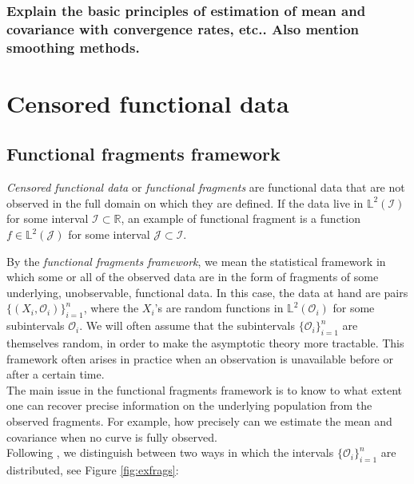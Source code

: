 \documentclass[10pt, a4paper]{report}
\newcommand{\Ll}[0]{\mathbb{L}}
\newcommand{\R}[0]{\mathbb{R}}
\theoremstyle{definition}
\theoremstyle{remark}
\begin{document}
\subsection{Explain the basic principles of estimation of mean and covariance with convergence rates, etc.. Also mention smoothing methods. }

\chapter{Censored functional data}
\section{Functional fragments framework}\label{introfrag}
\textit{Censored functional data} or \textit{functional fragments} are functional data that are not observed in the full domain on which they are defined. If the data live in $\Ll^2(\mathcal{I})$ for some interval $\mathcal{I} \subset \R$, an example of functional fragment is a function $f \in \Ll^2(\mathcal{J})$ for some interval $\mathcal{J}\subset \mathcal{I}$.

By the \textit{functional fragments framework}, we mean the statistical framework in which some or all of the observed data are in the form of fragments of some underlying, unobservable, functional data. In this case, the data at hand are pairs $\{(X_i,\mathcal{O}_i)\}_{i=1}^n$, where the $X_i$'s are random functions in $\Ll^2(\mathcal{O}_i)$ for some subintervals $\mathcal{O}_i$. We will often assume that the subintervals $\{\mathcal{O}_i\}_{i=1}^n$ are themselves random, in order to make the asymptotic theory more tractable. This framework often arises in practice when an observation is unavailable before or after a certain time.\\
The main issue in the functional fragments framework is to know to what extent one can recover precise information on the underlying population from the observed fragments. For example, how precisely can we estimate the mean and covariance when no curve is fully observed.\\
Following \cite{DP2}, we distinguish between two ways in which the intervals $\{\mathcal{O}_i\}_{i=1}^n$ are distributed, see Figure \ref{fig:exfrags}:\\
\end{document}
